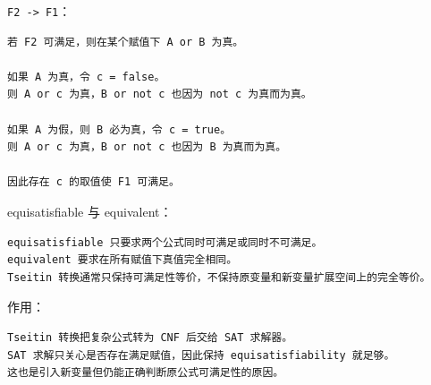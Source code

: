 \documentclass[UTF8]{ctexart}
\begin{document}
\texttt{F2 -> F1}：

\begin{Verbatim}[fontsize=\small,breaklines=true]
若 F2 可满足，则在某个赋值下 A or B 为真。

如果 A 为真，令 c = false。
则 A or c 为真，B or not c 也因为 not c 为真而为真。

如果 A 为假，则 B 必为真，令 c = true。
则 A or c 为真，B or not c 也因为 B 为真而为真。

因此存在 c 的取值使 F1 可满足。
\end{Verbatim}

equisatisfiable 与 equivalent：

\begin{Verbatim}[fontsize=\small,breaklines=true]
equisatisfiable 只要求两个公式同时可满足或同时不可满足。
equivalent 要求在所有赋值下真值完全相同。
Tseitin 转换通常只保持可满足性等价，不保持原变量和新变量扩展空间上的完全等价。
\end{Verbatim}

作用：

\begin{Verbatim}[fontsize=\small,breaklines=true]
Tseitin 转换把复杂公式转为 CNF 后交给 SAT 求解器。
SAT 求解只关心是否存在满足赋值，因此保持 equisatisfiability 就足够。
这也是引入新变量但仍能正确判断原公式可满足性的原因。
\end{Verbatim}
\end{document}

